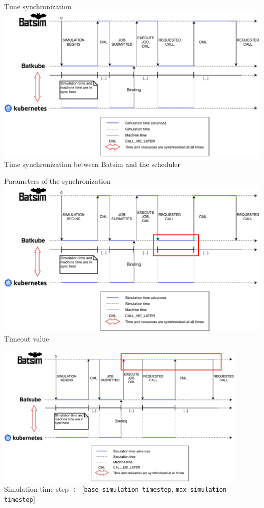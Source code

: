 \documentclass[12pt, aspectratio=43]{beamer}
\begin{document}
\begin{frame}{Time synchronization}
	\centering
	\includegraphics[width=\textwidth]{../imgs/lignes_de_temps_simple.pdf}\\
	\small{Time synchronization between Batsim and the scheduler}
\end{frame}

\begin{frame}[allowframebreaks]{Parameters of the synchronization}
		\centering
		\includegraphics[width=\textwidth]{../imgs/timeout.pdf}\\
		Timeout value

		\includegraphics[width=0.9\textwidth]{../imgs/max-timestep.pdf}\\
		Simulation time step $\in$ [\texttt{base-simulation-timestep}, \texttt{max-simulation-timestep}]
\end{frame}
\end{document}
